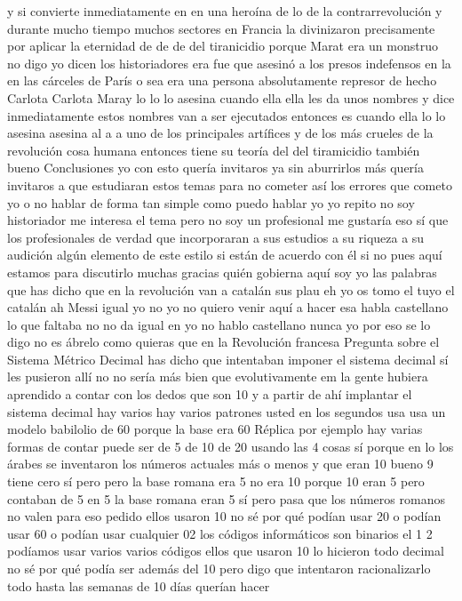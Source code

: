 y si convierte inmediatamente en en una heroína de lo de la contrarrevolución y durante mucho tiempo muchos sectores en Francia la divinizaron
precisamente por aplicar la eternidad de de de del tiranicidio porque Marat era un monstruo
no digo yo dicen los historiadores era fue que asesinó a los presos indefensos en la en las cárceles de París
o sea era una persona absolutamente represor de hecho Carlota Carlota Maray lo lo
lo asesina cuando ella ella les da unos nombres y dice inmediatamente estos nombres van a ser ejecutados entonces es cuando ella lo
lo asesina asesina al a a uno de los principales artífices y de los más crueles de la revolución
cosa humana entonces tiene su teoría del del tiramicidio también bueno
Conclusiones
yo con esto quería invitaros ya sin aburrirlos más quería invitaros a que estudiaran estos temas para no cometer así los errores que cometo yo
o no hablar de forma tan simple como puedo hablar yo yo repito no soy historiador me interesa el tema
pero no soy un profesional me gustaría eso sí que los profesionales de verdad que incorporaran a sus estudios
a su riqueza a su audición algún elemento de este estilo si están de acuerdo con él si no pues aquí estamos para discutirlo muchas gracias
quién gobierna aquí soy yo las palabras
que has dicho que en la revolución van a catalán sus plau eh yo os tomo el tuyo el catalán ah Messi igual yo no
yo no quiero venir aquí a hacer esa habla castellano lo que faltaba no no da igual en
yo no hablo castellano nunca yo por eso se lo digo no es ábrelo como quieras que en la Revolución francesa
Pregunta sobre el Sistema Métrico Decimal
has dicho que intentaban imponer el sistema decimal sí les pusieron allí
no no sería más bien que evolutivamente
em la gente hubiera aprendido a contar con los dedos que son 10 y a partir de ahí implantar el sistema decimal
hay varios hay varios patrones usted en los segundos usa usa un modelo babilolio de 60 porque la base era 60
Réplica
por ejemplo hay varias formas de contar puede ser de 5 de 10 de 20 usando las 4 cosas
sí porque en lo los árabes se inventaron los números actuales más o menos
y que eran 10 bueno 9 tiene cero sí pero pero la base romana era 5
no era 10 porque 10 eran 5 pero contaban de 5 en 5 la base romana eran 5 sí
pero pasa que los números romanos no valen para eso pedido ellos usaron 10 no sé por qué podían usar 20
o podían usar 60 o podían usar cualquier 02 los códigos informáticos son binarios el 1 2
podíamos usar varios varios códigos ellos que usaron 10 lo hicieron todo decimal no sé por qué podía ser además del 10
pero digo que intentaron racionalizarlo todo hasta las semanas de 10 días querían hacer
